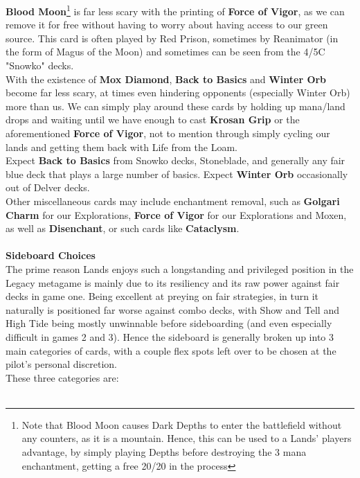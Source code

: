 \documentclass{report}
\begin{document}
\textbf{Blood Moon}\footnote{Note that Blood Moon causes Dark Depths to enter the battlefield without any counters, as it is a mountain. Hence, this can be used to a Lands' players advantage, by simply playing Depths before destroying the 3 mana enchantment, getting a free 20/20 in the process} is far less scary with the printing of \textbf{Force of Vigor}, as we can remove it for free without having to worry about having access to our green source. This card is often played by Red Prison, sometimes by Reanimator (in the form of Magus of the Moon) and sometimes can be seen from the 4/5C "Snowko" decks.\\
With the existence of \textbf{Mox Diamond}, \textbf{Back to Basics} and \textbf{Winter Orb} become far less scary, at times even hindering opponents (especially Winter Orb) more than us. We can simply play around these cards by holding up mana/land drops and waiting until we have enough to cast \textbf{Krosan Grip} or the aforementioned \textbf{Force of Vigor}, not to mention through simply cycling our lands and getting them back with Life from the Loam.\\
Expect \textbf{Back to Basics} from Snowko decks, Stoneblade, and generally any fair blue deck that plays a large number of basics. Expect \textbf{Winter Orb} occasionally out of Delver decks.\\
Other miscellaneous cards may include enchantment removal, such as \textbf{Golgari Charm} for our Explorations, \textbf{Force of Vigor} for our Explorations and Moxen, as well as \textbf{Disenchant}, or such cards like \textbf{Cataclysm}.\\\\
\textbf{Sideboard Choices\\}
The prime reason Lands enjoys such a longstanding and privileged position in the Legacy metagame is mainly due to its resiliency and its raw power against fair decks in game one. Being excellent at preying on fair strategies, in turn it naturally is positioned far worse against combo decks, with Show and Tell and High Tide being mostly unwinnable before sideboarding (and even especially difficult in games 2 and 3). Hence the sideboard is generally broken up into 3 main categories of cards, with a couple flex spots left over to be chosen at the pilot's personal discretion.\\
These three categories are:\\\\
\begin{description}[font=$\bullet$~]
\item[Enchantment and Artifact Removal]
\item[Answers to Combo and Sphere Effects]
\item[Non Graveyard Dependent Win Conditions]
\end{description}
\end{document}
